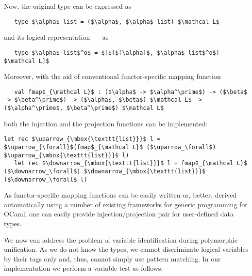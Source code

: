 Now, the original type can be expressed as

\begin{lstlisting}
   type $\alpha$ list = ($\alpha$, $\alpha$ list) $\mathcal L$
\end{lstlisting}

\noindent and its logical representation~--- as

\begin{lstlisting}
   type $\alpha$ list$^o$ = $[$($[\alpha]$, $\alpha$ list$^o$) $\mathcal L]$
\end{lstlisting}

Moreover, with the aid of conventional functor-specific mapping function

\begin{lstlisting}
   val fmap$_{\mathcal L}$ : ($\alpha$ -> $\alpha^\prime$) -> ($\beta$ -> $\beta^\prime$) -> ($\alpha$, $\beta$) $\mathcal L$ -> ($\alpha^\prime$, $\beta^\prime$) $\mathcal L$
\end{lstlisting}

\noindent both the injection and the projection functions can be implemented:

\begin{lstlisting}[mathescape=true]
   let rec $\uparrow_{\mbox{\texttt{list}}}$ l = $\uparrow_{\forall}$(fmap$_{\mathcal L}$ ($\uparrow_\forall$) $\uparrow_{\mbox{\texttt{list}}}$ l)
   let rec $\downarrow_{\mbox{\texttt{list}}}$ l = fmap$_{\mathcal L}$ ($\downarrow_\forall$) $\downarrow_{\mbox{\texttt{list}}}$ ($\downarrow_\forall$ l)
\end{lstlisting}

As functor-specific mapping functions can be easily written or, better, derived automatically using a number of existing frameworks for
generic programming for OCaml, one can easily provide injection/projection pair for user-defined data types.

We now can address the problem of variable identification during polymorphic unification. As we do not know the types, we cannot discriminate logical
variables by their tags only and, thus, cannot simply use pattern matching. In our implementation we perform a variable test
as follows:

